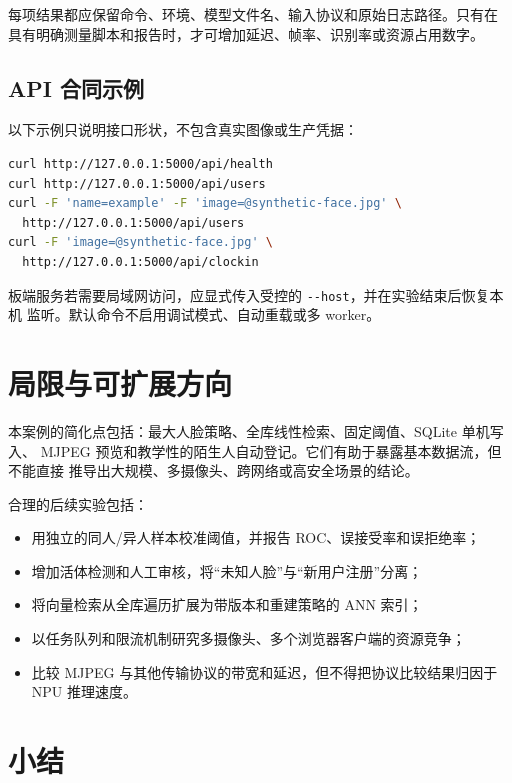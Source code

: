 每项结果都应保留命令、环境、模型文件名、输入协议和原始日志路径。只有在
具有明确测量脚本和报告时，才可增加延迟、帧率、识别率或资源占用数字。

\subsection{API 合同示例}\label{api-ux5408ux540cux793aux4f8b}

以下示例只说明接口形状，不包含真实图像或生产凭据：

\begin{lstlisting}[language=bash]
curl http://127.0.0.1:5000/api/health
curl http://127.0.0.1:5000/api/users
curl -F 'name=example' -F 'image=@synthetic-face.jpg' \
  http://127.0.0.1:5000/api/users
curl -F 'image=@synthetic-face.jpg' \
  http://127.0.0.1:5000/api/clockin
\end{lstlisting}

板端服务若需要局域网访问，应显式传入受控的
\passthrough{\lstinline!--host!}，并在实验结束后恢复本机
监听。默认命令不启用调试模式、自动重载或多 worker。

\section{局限与可扩展方向}\label{ux5c40ux9650ux4e0eux53efux6269ux5c55ux65b9ux5411}

本案例的简化点包括：最大人脸策略、全库线性检索、固定阈值、SQLite
单机写入、 MJPEG
预览和教学性的陌生人自动登记。它们有助于暴露基本数据流，但不能直接
推导出大规模、多摄像头、跨网络或高安全场景的结论。

合理的后续实验包括：

\begin{itemize}
\tightlist
\item
  用独立的同人/异人样本校准阈值，并报告 ROC、误接受率和误拒绝率；
\item
  增加活体检测和人工审核，将``未知人脸''与``新用户注册''分离；
\item
  将向量检索从全库遍历扩展为带版本和重建策略的 ANN 索引；
\item
  以任务队列和限流机制研究多摄像头、多个浏览器客户端的资源竞争；
\item
  比较 MJPEG 与其他传输协议的带宽和延迟，但不得把协议比较结果归因于 NPU
  推理速度。
\end{itemize}

\section{小结}\label{ux5c0fux7ed3}

